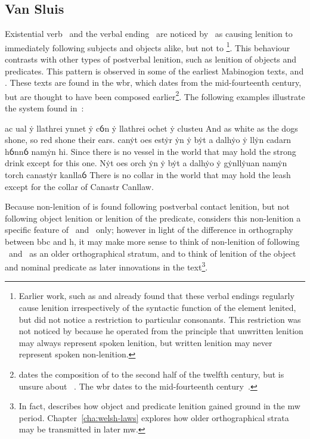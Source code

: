\subsection{Van Sluis}
\label{sec:van-sluis}
Existential verb \oes\ and the verbal ending \ei\ are noticed by~\textcite{van_development14} as causing lenition to immediately following subjects and objects alike, but not to \footnote{Earlier work, such as \textcite[§~21]{evans_grammar_1964} and \textcite[§~70]{morgan_y_1952} already found that these verbal endings regularly cause lenition irrespectively of the syntactic function of the element lenited, but did not notice a restriction to particular consonants. This restriction was not noticed by \textcite[§~71]{morgan_y_1952} because he operated from the principle that unwritten lenition may always represent spoken lenition, but written lenition may never represent spoken non-lenition.}. This behaviour contrasts with other types of postverbal lenition, such as lenition of objects and predicates. This pattern is observed in some of the earliest Mabinogion texts, \ie {} and . These texts are found in the \gls{wbr}, which dates from the mid-fourteenth century, but are thought to have been composed earlier\footnote{\Textcite[43]{rodway_date_2005} dates the composition of  to the second half of the twelfth century, but is unsure about ~\autocite[59]{Rod_Where07}. The \gls{wbr} dates to the mid-fourteenth century~\autocite[59]{huws_medieval_2000}.}. The following examples  illustrate the system found in~\textcite{van_development14}:
\begin{mwl}
  {ac ual ẏ llathrei ynnet ẏ cỽn ẏ llathrei ochet ẏ clusteu}%
  {And as white as the dogs shone, so red shone their ears.}%
  {canẏt oes estẏr ẏn ẏ bẏt a dalhẏo ẏ llẏn cadarn hỽnnỽ namẏn hi.}%
  {Since there is no vessel in the world that may hold the strong drink except for this one.}%
  {Nẏt oes orch ẏn ẏ bẏt a dalhẏo ẏ gẏnllẏuan namẏn torch canastẏr kanllaỽ}%
  {There is no collar in the world that may hold the leash except for the collar of Canastr Canllaw.}%
\end{mwl}
Because non-lenition of  is found following postverbal contact lenition, but not following object lenition or lenition of the predicate, \textcite{van_development14} considers this non-lenition a specific feature of \ei\ and \oes\ only; however in light of the difference in orthography between \gls{bbc} and \gls{h}, it may make more sense to think of non-lenition of  following \ei\ and \oes\ as an older orthographical stratum, and to think of lenition of the object and nominal predicate as later innovations in the text\footnote{In fact, \textcite{van_development14} describes how object and predicate lenition gained ground in the \gls{mw} period. Chapter~\ref{cha:welsh-laws} explores how older orthographical strata may be transmitted in later \gls{mw}.}.

